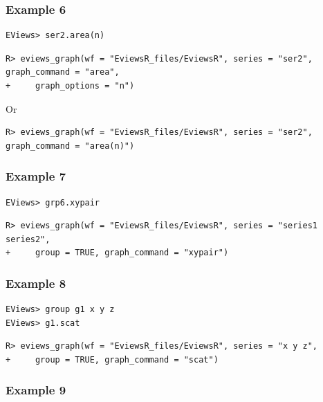 \hypertarget{example-6}{%
\subsubsection{Example 6}\label{example-6}}

\begin{verbatim}
EViews> ser2.area(n)
\end{verbatim}

\begin{verbatim}
R> eviews_graph(wf = "EviewsR_files/EviewsR", series = "ser2", graph_command = "area",
+     graph_options = "n")
\end{verbatim}

Or

\begin{verbatim}
R> eviews_graph(wf = "EviewsR_files/EviewsR", series = "ser2", graph_command = "area(n)")
\end{verbatim}

\hypertarget{example-7}{%
\subsubsection{Example 7}\label{example-7}}

\begin{verbatim}
EViews> grp6.xypair
\end{verbatim}

\begin{verbatim}
R> eviews_graph(wf = "EviewsR_files/EviewsR", series = "series1 series2",
+     group = TRUE, graph_command = "xypair")
\end{verbatim}

\hypertarget{example-8}{%
\subsubsection{Example 8}\label{example-8}}

\begin{verbatim}
EViews> group g1 x y z
EViews> g1.scat
\end{verbatim}

\begin{verbatim}
R> eviews_graph(wf = "EviewsR_files/EviewsR", series = "x y z",
+     group = TRUE, graph_command = "scat")
\end{verbatim}

\hypertarget{example-9}{%
\subsubsection{Example 9}\label{example-9}}

